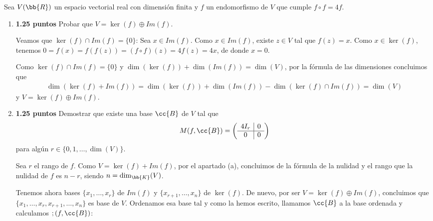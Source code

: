 \documentclass[12pt]{article}
\begin{document}
    \begin{ejercicio}[2.5 puntos]
        Sea $V(\bb{R})$ un espacio vectorial real con dimensión finita y $f$ un endomorfismo de $V$ que cumple $f \circ f = 4f$.

        \begin{enumerate}
            \item \textbf{1.25 puntos} Probar que $V = \ker(f) \oplus Im(f)$.
            
            Veamos que $\ker(f) \cap Im(f) = \{0\}$: Sea $x \in Im(f)$. Como $x\in Im(f)$, existe $z \in V$ tal que $f(z)=x$. Como $x\in \ker(f)$, tenemos $0 = f(x) = f(f(z)) = (f \circ f)(z) = 4f(z) = 4x$, de donde $x=0$.

            Como $\ker(f) \cap Im(f) = \{0\}$ y $\dim(\ker(f)) + \dim(Im(f)) = \dim(V)$, por la fórmula de las dimensiones concluimos que
            \begin{gather*}
                \dim(\ker(f)+Im(f)) = \dim(\ker(f)) + \dim(Im(f)) - \dim(\ker(f)\cap Im(f)) = \dim(V)
            \end{gather*}
            y $V = \ker(f) \oplus Im(f).$

            \item \textbf{1.25 puntos} Demostrar que existe una base $\cc{B}$ de $V$ tal que 
            \begin{gather*}
                M(f, \cc{B}) = 
                \left(
                \begin{array}{c|c}
                    4 I_r &  0\\
                    \hline
                    0 & 0 \\
                \end{array}
                \right)
            \end{gather*}
            para algún $r \in \{0,1,\dots,\dim(V)\}$.

            Sea $r$ el rango de $f$. Como $V = \ker(f) + Im(f)$, por el apartado (a), concluimos de la fórmula de la nulidad y el rango que la nulidad de $f$ es $n -r$, siendo $n = \dim_{\bb{K}}(V)$.

            Tenemos ahora bases $\{x_1, \dots, x_r\}$ de $Im(f)$ y $\{x_{r+1}, \dots, x_n\}$ de $\ker(f)$. De nuevo, por ser $V = \ker(f) \oplus Im(f)$, concluimos que $\{x_1, \dots, x_r, x_{r+1}, \dots, x_n\}$ es base de $V$. Ordenamos esa base tal y como la hemos escrito, llamamos $\cc{B}$ a la base ordenada y calculamos $;(f,\cc{B})$:


\end{enumerate}
\end{ejercicio}
\end{document}

